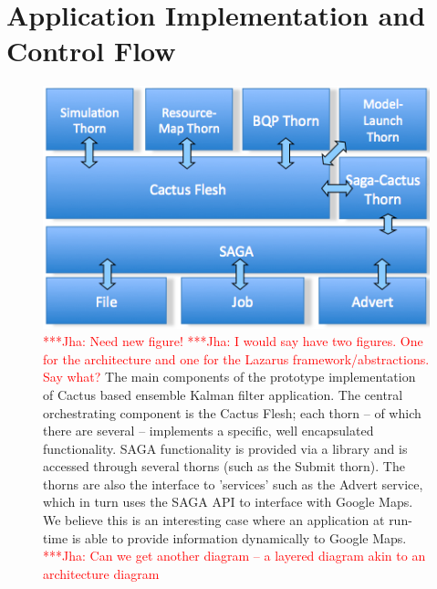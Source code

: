\documentclass[conference,final]{IEEEtran}
\newcommand{\yaakoub}[0]{}
\newcommand{\jhanote}[1]{ {\textcolor{red} { ***Jha: #1 }}}
\begin{document}



\section{Application Implementation and Control Flow} 

\begin{figure}
\begin{center}
\includegraphics[scale=0.34]{./figures/kalmanfilterlayer.png}
\end{center}
\caption{\jhanote{Need new figure!}  \jhanote{I would say have two
    figures. One for the architecture and one for the Lazarus
    framework/abstractions. Say what?}  The main components of the
  prototype implementation of Cactus based ensemble Kalman filter
  application. The central orchestrating component is the Cactus
  Flesh; each thorn -- of which there are several -- implements a
  specific, well encapsulated functionality.  SAGA functionality is
  provided via a library and is accessed through several thorns (such
  as the Submit thorn).  The thorns are also the interface to
  'services' such as the Advert service, which in turn uses the SAGA
  API to interface with Google Maps. We believe this is an interesting
  case where an application at run-time is able to provide information
  dynamically to Google Maps. \jhanote{Can we get another diagram -- a
    layered diagram akin to an architecture diagram}}
\label{fig:application_architecture}
\end{figure}
\end{document}
